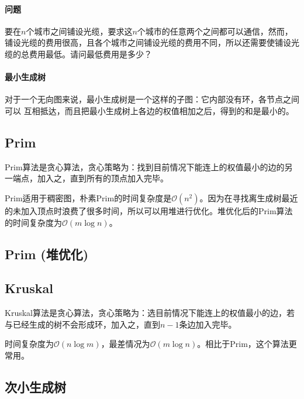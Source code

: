 \paragraph{问题} 要在$n$个城市之间铺设光缆，要求这$n$个城市的任意两个之间都可以通信，然而，铺设光缆的费用很高，且各个城市之间铺设光缆的费用不同，所以还需要使铺设光缆的总费用最低。请问最低费用是多少？

\paragraph{最小生成树} 对于一个无向图来说，最小生成树是一个这样的子图：它内部没有环，各节点之间可以 互相抵达，而且把最小生成树上各边的权值相加之后，得到的和是最小的。

\subsection{Prim}

Prim算法是贪心算法，贪心策略为：找到目前情况下能连上的权值最小的边的另一端点，加入之，直到所有的顶点加入完毕。

Prim适用于稠密图，朴素Prim的时间复杂度是$\mathcal{O}(n^2)$。因为在寻找离生成树最近的未加入顶点时浪费了很多时间，所以可以用堆进行优化。堆优化后的Prim算法的时间复杂度为$\mathcal{O}(m\log n)$。



\subsection{Prim (堆优化)}


\subsection{Kruskal}

Kruskal算法是贪心算法，贪心策略为：选目前情况下能连上的权值最小的边，若与已经生成的树不会形成环，加入之，直到$n−1$条边加入完毕。

时间复杂度为$\mathcal{O}(n\log m)$，最差情况为$\mathcal{O}(m\log n)$。相比于Prim，这个算法更常用。



\subsection{次小生成树}

